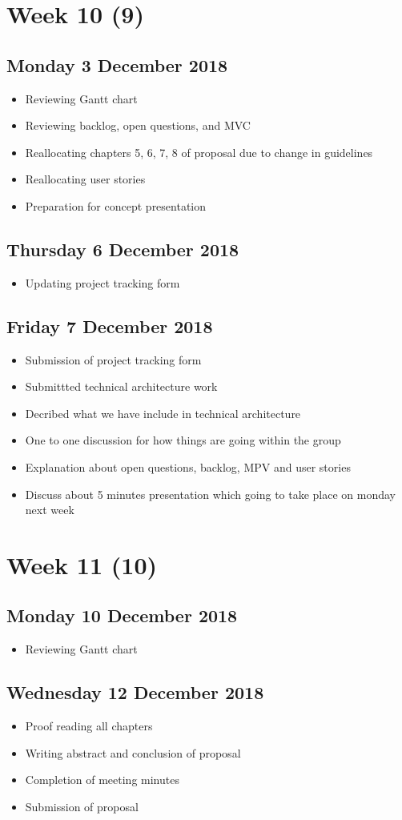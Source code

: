 \section*{Week 10 (9)}
\subsection*{Monday 3 December 2018}
\begin{itemize}
	\item Reviewing Gantt chart
	\item Reviewing backlog, open questions, and MVC
	\item Reallocating chapters 5, 6, 7, 8 of proposal due to change in guidelines
	\item Reallocating user stories
	\item Preparation for concept presentation
\end{itemize}

\subsection*{Thursday 6 December 2018}
\begin{itemize}
	\item Updating project tracking form
\end{itemize}

\subsection*{Friday 7 December 2018}
\begin{itemize}
	\item Submission of project tracking form
	\item Submittted technical architecture work
	\item Decribed what we have include in technical architecture
	\item One to one discussion for how things are going within the group
	\item Explanation about open questions, backlog, MPV and user stories
	\item Discuss about 5 minutes presentation which going to take place on monday next week
\end{itemize}

\section*{Week 11 (10)}
\subsection*{Monday 10 December 2018}
\begin{itemize}
	\item Reviewing Gantt chart
\end{itemize}

\subsection*{Wednesday 12 December 2018}
\begin{itemize}
	\item Proof reading all chapters
	\item Writing abstract and conclusion of proposal
	\item Completion of meeting minutes
	\item Submission of proposal
\end{itemize}
